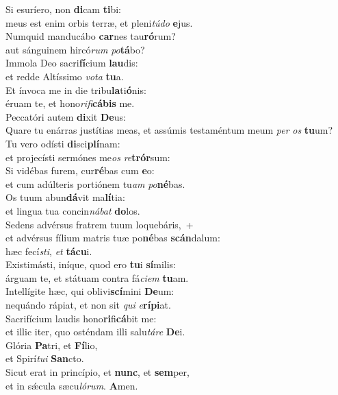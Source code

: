 \oddverse Si esuríero, non \textbf{di}cam \textbf{ti}bi:~\*\\
\oddverse meus est enim orbis terræ, et pleni\textit{tú}\textit{do} \textbf{e}jus.\\
\evenverse Numquid manducábo \textbf{car}nes tau\textbf{ró}rum?~\*\\
\evenverse aut sánguinem hircó\textit{rum} \textit{po}\textbf{tá}bo?\\
\oddverse Immola Deo sacri\textbf{fí}cium \textbf{lau}dis:~\*\\
\oddverse et redde Altíssimo \textit{vo}\textit{ta} \textbf{tu}a.\\
\evenverse Et ínvoca me in die tribu\textbf{la}ti\textbf{ó}nis:~\*\\
\evenverse éruam te, et hono\textit{ri}\textit{fi}\textbf{cá}\textbf{bis} me.\\
\oddverse Peccatóri autem \textbf{di}xit \textbf{De}us:~\*\\
\oddverse Quare tu enárras justítias meas, et assúmis testaméntum meum \textit{per} \textit{os} \textbf{tu}um?\\
\evenverse Tu vero odísti \textbf{di}sci\textbf{plí}nam:~\*\\
\evenverse et projecísti sermónes me\textit{os} \textit{re}\textbf{trór}sum:\\
\oddverse Si vidébas furem, cur\textbf{ré}bas cum \textbf{e}o:~\*\\
\oddverse et cum adúlteris portiónem tu\textit{am} \textit{po}\textbf{né}bas.\\
\evenverse Os tuum abun\textbf{dá}vit ma\textbf{lí}tia:~\*\\
\evenverse et lingua tua concin\textit{ná}\textit{bat} \textbf{do}los.\\
\oddverse Sedens advérsus fratrem tuum loquebáris,~+\\
\oddverse  et advérsus fílium matris tuæ po\textbf{né}bas \textbf{scán}dalum:~\*\\
\oddverse hæc fecí\textit{sti}, \textit{et} \textbf{tá}\textbf{cu}i.\\
\evenverse Existimásti, iníque, quod ero \textbf{tu}i \textbf{sí}milis:~\*\\
\evenverse árguam te, et státuam contra fá\textit{ci}\textit{em} \textbf{tu}am.\\
\oddverse Intellígite hæc, qui oblivi\textbf{scí}mini \textbf{De}um:~\*\\
\oddverse nequándo rápiat, et non sit \textit{qui} \textit{e}\textbf{rí}\textbf{pi}at.\\
\evenverse Sacrifícium laudis hono\textbf{ri}fi\textbf{cá}bit me:~\*\\
\evenverse et illic iter, quo osténdam illi salu\textit{tá}\textit{re} \textbf{De}i.\\
\oddverse Glória \textbf{Pa}tri, et \textbf{Fí}lio,~\*\\
\oddverse et Spirí\textit{tu}\textit{i} \textbf{San}cto.\\
\evenverse Sicut erat in princípio, et \textbf{nunc}, et \textbf{sem}per,~\*\\
\evenverse et in sǽcula sæcu\textit{ló}\textit{rum}. \textbf{A}men.\\
